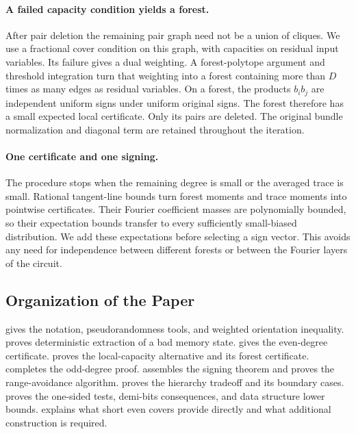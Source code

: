 \documentclass[letterpaper,11pt]{article}
\theoremstyle{definition}
\begin{document}
\paragraph{A failed capacity condition yields a forest.}
After pair deletion the remaining pair graph need not be a union of
cliques. We use a fractional cover condition on this graph, with
capacities on residual input variables. Its failure gives a dual
weighting. A forest-polytope argument and threshold integration turn
that weighting into a forest containing more than $D$ times as many
edges as residual variables. On a forest, the products $b_i b_j$
are independent uniform signs under uniform original signs.
The forest therefore has a small expected local certificate.
Only its pairs are deleted. The original bundle normalization and
diagonal term are retained throughout the iteration.

\paragraph{One certificate and one signing.}
The procedure stops when the remaining degree is small or the
averaged trace is small. Rational tangent-line bounds turn forest
moments and trace moments into pointwise certificates. Their Fourier
coefficient masses are polynomially bounded, so their expectation
bounds transfer to every sufficiently small-biased distribution.
We add these expectations before selecting a sign vector. This
avoids any need for independence between different forests or
between the Fourier layers of the circuit.

\subsection{Organization of the Paper}
 gives the notation, pseudorandomness tools,
and weighted orientation inequality.
 proves deterministic extraction of a bad memory
state.  gives the even-degree certificate.
 proves the local-capacity alternative and its
forest certificate.  completes the odd-degree proof.
 assembles the signing theorem and proves the
range-avoidance algorithm.  proves the hierarchy
tradeoff and its boundary cases.
 proves the one-sided tests, demi-bits
consequences, and data structure lower bounds.
 explains what short even covers provide
directly and what additional construction is required.
\end{document}
